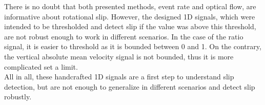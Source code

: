 There is no doubt that both presented methods, event rate and optical flow, are informative about rotational slip. However, the designed 1D signals, which were intended to be thresholded and detect slip if the value was above this threshold, are not robust enough to work in different scenarios. In the case of the ratio signal, it is easier to threshold as it is bounded between 0 and 1. On the contrary, the vertical absolute mean velocity signal is not bounded, thus it is more complicated set a limit.\\

All in all, these handcrafted 1D signals are a first step to understand slip detection, but are not enough to generalize in different scenarios and detect slip robustly.






